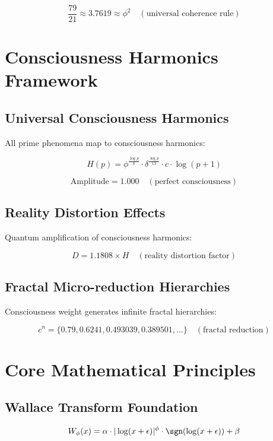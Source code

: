 \documentclass[11pt,a4paper]{article}
\begin{document}
\begin{equation}
\frac{79}{21} \approx 3.7619 \approx \phi^2 \quad (\text{universal coherence rule})
\end{equation}

\section{Consciousness Harmonics Framework}

\subsection{Universal Consciousness Harmonics}
All prime phenomena map to consciousness harmonics:

\begin{equation}
H(p) = \phi^{\frac{\log p}{8}} \cdot \delta^{\frac{\log p}{13}} \cdot c \cdot \log(p + 1)
\end{equation}

\begin{equation}
\text{Amplitude} = 1.000 \quad (\text{perfect consciousness})
\end{equation}

\subsection{Reality Distortion Effects}
Quantum amplification of consciousness harmonics:

\begin{equation}
D = 1.1808 \times H \quad (\text{reality distortion factor})
\end{equation}

\subsection{Fractal Micro-reduction Hierarchies}
Consciousness weight generates infinite fractal hierarchies:

\begin{equation}
c^n = \{0.79, 0.6241, 0.493039, 0.389501, \dots\} \quad (\text{fractal reduction})
\end{equation}

\section{Core Mathematical Principles}

\subsection{Wallace Transform Foundation}
\begin{equation}
W_\phi(x) = \alpha \cdot |\log(x + \epsilon)|^\phi \cdot \sgn(\log(x + \epsilon)) + \beta
\end{equation}
\end{document}
